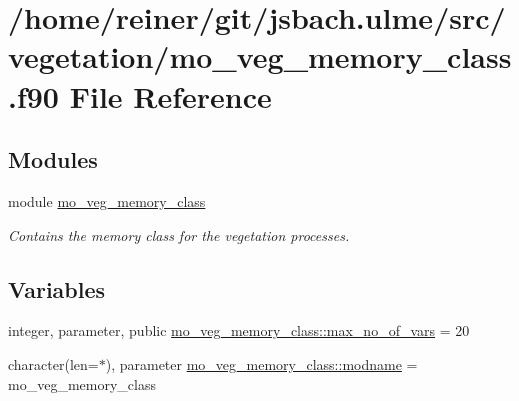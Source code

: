 \hypertarget{mo__veg__memory__class_8f90}{}\section{/home/reiner/git/jsbach.ulme/src/vegetation/mo\+\_\+veg\+\_\+memory\+\_\+class.f90 File Reference}
\label{mo__veg__memory__class_8f90}
\subsection*{Modules}
\begin{DoxyCompactItemize}
\item 
module \hyperlink{namespacemo__veg__memory__class}{mo\+\_\+veg\+\_\+memory\+\_\+class}
\begin{DoxyCompactList}\small\item\em Contains the memory class for the vegetation processes. \end{DoxyCompactList}\end{DoxyCompactItemize}
\subsection*{Variables}
\begin{DoxyCompactItemize}
\item 
integer, parameter, public \hyperlink{namespacemo__veg__memory__class_a4e9663c4612a17a86ffc9ac33644edc2}{mo\+\_\+veg\+\_\+memory\+\_\+class\+::max\+\_\+no\+\_\+of\+\_\+vars} = 20
\item 
character(len=$\ast$), parameter \hyperlink{namespacemo__veg__memory__class_a636c20bbb0af5d76979ff7931ab402d2}{mo\+\_\+veg\+\_\+memory\+\_\+class\+::modname} = \textquotesingle{}mo\+\_\+veg\+\_\+memory\+\_\+class\textquotesingle{}
\end{DoxyCompactItemize}
